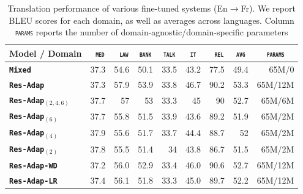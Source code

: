 \documentclass[11pt,a4paper]{article}
\newcommand{\fyDone}[1]{\done[FY]\Todo[FY:]{\textcolor{orange}{#1}}}
\newcommand{\domain}[1]{\texttt{\textsc{#1}}}
\newcommand{\system}[1]{\texttt{\textbf{#1}}}
\begin{document}

\begin{table}[htbp]
  \centering
  \begin{tabular}{|p{3cm}|*{8}{r|}} \hline
    Model / Domain & \multicolumn{1}{c|}{\domain{ med}} & \multicolumn{1}{c|}{\domain{ law}} & \multicolumn{1}{c|}{\domain{bank}} & \multicolumn{1}{c|}{\domain{talk}} & \multicolumn{1}{c|}{\domain{ it }} & \multicolumn{1}{c|}{\domain{ rel}} & \multicolumn{1}{c|}{\domain{avg}} & \multicolumn{1}{c|}{\domain{params}} \\ \hline 
    \system{Mixed}  & 37.3 & 54.6 & 50.1 & 33.5 & 43.2 & 77.5  & 49.4 & 65M/0 \\
    \system{Res-Adap}     & 37.3 & 57.9 & 53.9 & 33.8 & 46.7 & 90.2 & 53.3 & 65M/12M\\ \hline
    \system{Res-Adap$_{(2,4,6)}$}     & 37.7 & 57 & 53 & 33.3 & 45 & 90 & 52.7 & 65M/6M\\
    \system{Res-Adap$_{(6)}$}     & 37.7 & 55.8 & 51.5 & 33.9 & 43.6 & 89.2 & 51.9 & 65M/2M \\
    \system{Res-Adap$_{(4)}$}     & 37.9 & 55.6 & 51.7 & 33.7 & 44.4 & 88.7 & 52 & 65M/2M\\
    \system{Res-Adap$_{(2)}$}     & 37.8 & 55.5 & 51.4 & 34 & 43.8 & 86.7 & 51.5 & 65M/2M\\ \hline
    \system{Res-Adap-WD}     & 37.2 & 56.0 & 52.9 & 33.4 & 46.0 & 90.6 & 52.7 & 65M/12M \\
    \system{Res-Adap-LR}      & 37.4 & 56.1 & 51.8 & 33.3 & 45.0 & 89.7 & 52.2 & 65M/12M \\  
     \hline
  \end{tabular}
  \caption{Translation performance of various fine-tuned systems (En$\rightarrow$Fr). We report BLEU scores for each domain, as well as averages across languages. Column \domain{params} reports the number of domain-agnostic/domain-specific parameters \label{tab:performance-en-fr-pos-reg}} \fyDone{Boldface ?}
\end{table}
\end{document}
